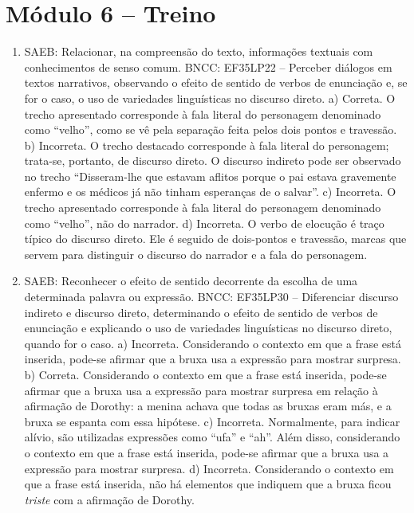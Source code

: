 \section*{Módulo 6 – Treino}

\begin{enumerate}
\item
SAEB: Relacionar, na compreensão do texto, informações textuais com
conhecimentos de senso comum.
BNCC: EF35LP22 -- Perceber diálogos em textos narrativos, observando o
efeito de sentido de verbos de enunciação e, se for o caso, o uso de
variedades linguísticas no discurso direto.
a) Correta. O trecho apresentado corresponde à fala literal do personagem
denominado como ``velho'', como se vê pela separação feita pelos dois
pontos e travessão.
b) Incorreta. O trecho destacado corresponde à fala literal do personagem; 
trata-se, portanto, de discurso direto. O discurso indireto
pode ser observado no trecho ``Disseram-lhe que estavam aflitos
porque o pai estava gravemente enfermo e os médicos já não tinham
esperanças de o salvar''.
c) Incorreta. O trecho apresentado corresponde à fala literal do personagem
denominado como ``velho'', não do narrador.  
d) Incorreta. O verbo de elocução é traço típico do discurso direto. Ele é
seguido de dois-pontos e travessão, marcas que servem para distinguir o 
discurso do narrador e a fala do personagem.

\item
SAEB: Reconhecer o efeito
de sentido decorrente da escolha de uma determinada palavra ou
expressão.
BNCC: EF35LP30 -- Diferenciar discurso indireto e discurso direto,
determinando o efeito de sentido de verbos de enunciação e explicando o
uso de variedades linguísticas no discurso direto, quando for o caso.
a) Incorreta. Considerando o contexto em que a frase está inserida, 
pode-se afirmar que a bruxa usa a expressão para mostrar surpresa.
b) Correta. Considerando o contexto em que a frase está inserida, 
pode-se afirmar que a bruxa usa a expressão para mostrar surpresa em 
relação à afirmação de Dorothy: a menina achava que todas as bruxas eram
más, e a bruxa se espanta com essa hipótese.
c)  Incorreta. Normalmente, para indicar alívio, são utilizadas
expressões como ``ufa'' e ``ah''. Além disso, considerando o contexto em
que a frase está inserida, pode-se afirmar que a bruxa usa a expressão 
para mostrar surpresa.
d)  Incorreta. Considerando o contexto em que a frase está inserida, 
não há elementos que indiquem que a bruxa ficou \textit{triste} com a 
afirmação de Dorothy.


\end{enumerate}
